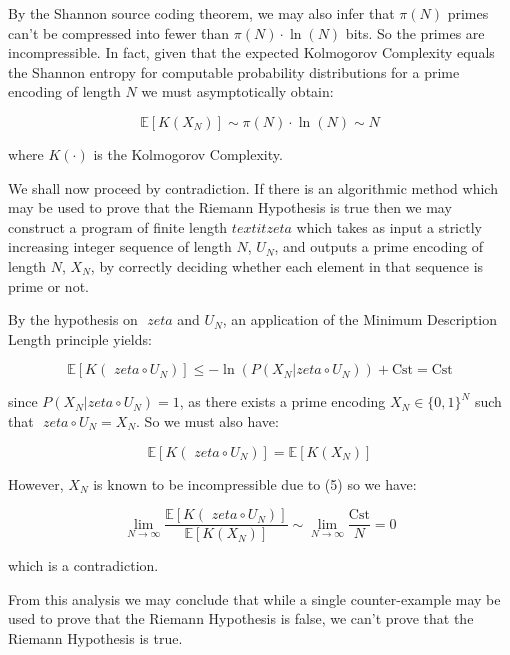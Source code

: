 \documentclass{article}
\begin{document}
By the Shannon source coding theorem, we may also infer that $\pi(N)$ primes can't be compressed into fewer than $\pi(N) \cdot \ln(N)$ bits. So the primes are incompressible. In fact, given that the expected Kolmogorov Complexity equals the Shannon entropy for computable probability distributions for a prime encoding of length $N$ we must asymptotically obtain:

\begin{equation}
\mathbb{E}[K(X_N)] \sim \pi(N) \cdot \ln(N) \sim N
\end{equation}

where $K(\cdot)$ is the Kolmogorov Complexity.

We shall now proceed by contradiction. If there is an algorithmic method which may be used to prove that the Riemann Hypothesis is true then we may construct a program of finite length $textit{ zeta}$ which takes as input a strictly increasing integer sequence of length $N$, $U_N$, and outputs a prime encoding of length $N$, $X_N$, by correctly deciding whether each element in that sequence is prime or not.

By the hypothesis on $\textit{ zeta}$ and $U_N$, an application of the Minimum Description Length principle yields:

\begin{equation}
\mathbb{E}[K(\textit{ zeta} \circ U_N)] \leq -\ln(P(X_N \lvert \textit{zeta} \circ U_N)) + \text{Cst} = \text{Cst} 	
\end{equation}

since $P(X_N \lvert \textit{zeta} \circ U_N) = 1$, as there exists a prime encoding $X_N \in \{0,1\}^N$ such that $\textit{ zeta} \circ U_N = X_N$. So we must also have:

\begin{equation}
\mathbb{E}[K(\textit{ zeta} \circ U_N)] = \mathbb{E}[K(X_N)]
\end{equation}

However, $X_N$ is known to be incompressible due to (5) so we have:

\begin{equation}
\lim_{N \to \infty} \frac{\mathbb{E}[K(\textit{ zeta} \circ U_N)]}{\mathbb{E}[K(X_N)]} \sim \lim_{N \to \infty} \frac{\text{Cst}}{N} = 0
\end{equation}

which is a contradiction.

From this analysis we may conclude that while a single counter-example may be used to prove that the Riemann Hypothesis is false, we can't prove that the Riemann Hypothesis is true.
\end{document}
